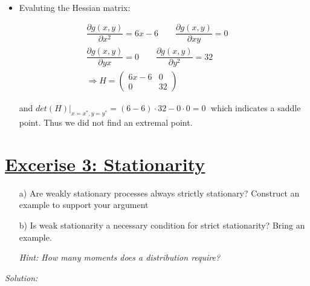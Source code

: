 \documentclass[12pt,a4paper]{article}
\newcommand{\tmpsection}[1]{}
\let\tmpsection=\section
\renewcommand{\section}[1]{\tmpsection{\underline{#1}} }
\begin{document}
\begin{itemize}
\begin{align*}
    \end{align*}
    \begin{itemize}
      \item Evaluting the Hessian matrix:
    \end{itemize}
    \begin{align*}
      \dfrac{\partial g(x,y)}{\partial x^2} = 6x- 6 \qquad  \dfrac{\partial g(x,y)}{\partial xy} = 0 \\
      \dfrac{\partial g(x,y)}{\partial yx} = 0  \qquad  \dfrac{\partial g(x,y)}{\partial y^2} = 32\\
      \Rightarrow H = 
      \begin{pmatrix}
        6x- 6 & 0 \\
        0 & 32
      \end{pmatrix}
    \end{align*}
    \begin{itemize}
      \item[] and $det(H)|_{x = x^{*}, y = y^{*}} = (6-6)  \cdot 32 - 0 \cdot 0 = 0 \;$ which indicates a saddle point. Thus we did not find an extremal point.
    \end{itemize}
\end{itemize}

\hypertarget{excerise-3-stationarity}{%
\section{Excerise 3: Stationarity}\label{excerise-3-stationarity}}

\begin{itemize}
    \item[a)] Are weakly stationary processes always strictly stationary? Construct an example to support your argument
    \item[b)] Is weak stationarity a necessary condition for strict stationarity? Bring an example.
    \item[] \textit{Hint: How many moments does a distribution require?}
\end{itemize}

\emph{Solution:}
\end{document}
